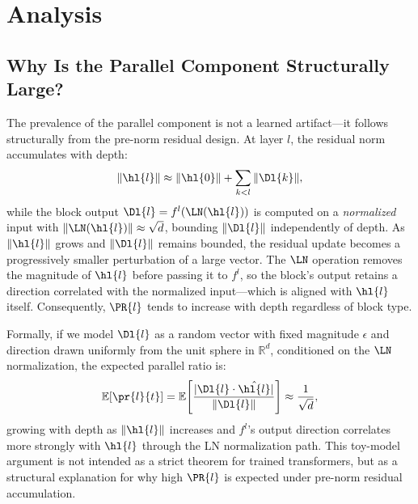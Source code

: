 %
%
%

\section{Analysis}
\label{sec:analysis}

\subsection{Why Is the Parallel Component Structurally Large?}
\label{sec:why}

The prevalence of the parallel component is not a learned artifact—it
follows structurally from the pre-norm residual design.  At layer $l$, the
residual norm accumulates with depth:
\begin{equation}
  \|\hl{l}\| \approx \|\hl{0}\| + \sum_{k<l} \|\Dl{k}\|,
\end{equation}
while the block output $\Dl{l} = f^l(\LN(\hl{l}))$ is computed on a
\emph{normalized} input with $\|\LN(\hl{l})\| \approx \sqrt{d}$,
bounding $\|\Dl{l}\|$ independently of depth.  As $\|\hl{l}\|$ grows and
$\|\Dl{l}\|$ remains bounded, the residual update becomes a progressively
smaller perturbation of a large vector.  The $\LN$ operation removes the
magnitude of $\hl{l}$ before passing it to $f^l$, so the block's output
retains a direction correlated with the normalized input—which is aligned
with $\hl{l}$ itself.  Consequently, $\PR{l}$ tends to increase with depth
regardless of block type.

Formally, if we model $\Dl{l}$ as a random vector with fixed magnitude
$\epsilon$ and direction drawn uniformly from the unit sphere in $\mathbb{R}^d$,
conditioned on the $\LN$ normalization, the expected parallel ratio is:
\begin{equation}
  \mathbb{E}[\pr{l}{t}]
    = \mathbb{E}\!\left[\frac{|\Dl{l} \cdot \hat{\hl{l}}|}{\|\Dl{l}\|}\right]
    \approx \frac{1}{\sqrt{d}},
\end{equation}
\noindent
growing with depth as $\|\hl{l}\|$ increases and $f^l$'s output direction
correlates more strongly with $\hl{l}$ through the LN normalization path.
This toy-model argument is not intended as a strict theorem for trained
transformers, but as a structural explanation for why high $\PR{l}$ is
expected under pre-norm residual accumulation.

